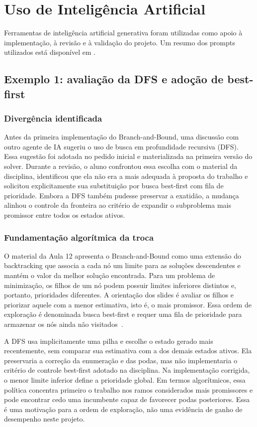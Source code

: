 \documentclass[12pt]{article}
\begin{document}
\section{Uso de Inteligência Artificial}

Ferramentas de inteligência artificial generativa foram utilizadas como apoio
à implementação, à revisão e à validação do projeto. Um resumo dos prompts
utilizados está disponível em
.

\subsection{Exemplo 1: avaliação da DFS e adoção de best-first}

\subsubsection{Divergência identificada}

Antes da primeira implementação do Branch-and-Bound, uma discussão com outro
agente de IA sugeriu o uso de busca em profundidade recursiva (DFS). Essa
sugestão foi adotada no pedido inicial e materializada na primeira versão do
solver. Durante a revisão, o aluno confrontou essa escolha com o material da
disciplina, identificou que ela não era a mais adequada à proposta do trabalho
e solicitou explicitamente sua substituição por busca best-first com fila de
prioridade. Embora a DFS também pudesse preservar a exatidão, a mudança alinhou
o controle da fronteira ao critério de expandir o subproblema mais promissor
entre todos os estados ativos.

\subsubsection{Fundamentação algorítmica da troca}

O material da Aula 12 apresenta o Branch-and-Bound como uma extensão do
backtracking que associa a cada nó um limite para as soluções descendentes e
mantém o valor da melhor solução encontrada. Para um problema de minimização,
os filhos de um nó podem possuir limites inferiores distintos e, portanto,
prioridades diferentes. A orientação dos slides é avaliar os filhos e priorizar
aquele com a menor estimativa, isto é, o mais promissor. Essa ordem de
exploração é denominada busca best-first e requer uma fila de prioridade para
armazenar os nós ainda não visitados~\cite{vimieiro2026aula12}.

A DFS usa implicitamente uma pilha e escolhe o estado gerado mais recentemente,
sem comparar sua estimativa com a dos demais estados ativos. Ela preservaria a
correção da enumeração e das podas, mas não implementaria o critério de controle
best-first adotado na disciplina. Na implementação corrigida, o menor limite
inferior define a prioridade global. Em termos algorítmicos, essa política
concentra primeiro o trabalho nos ramos considerados mais promissores e pode
encontrar cedo uma incumbente capaz de favorecer podas posteriores. Essa é uma
motivação para a ordem de exploração, não uma evidência de ganho de desempenho
neste projeto.
\end{document}

